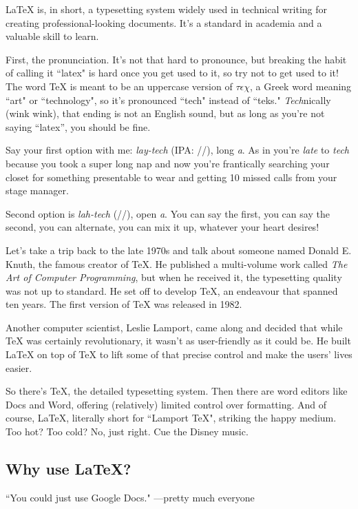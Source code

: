 \documentclass[letterpaper, 12pt]{article}
\begin{document}
\LaTeX{} is, in short, a typesetting system widely used in technical writing for creating professional-looking documents. It's a standard in academia and a valuable skill to learn.

First, the pronunciation. It's not that hard to pronounce, but breaking the habit of calling it ``latex" is hard once you get used to it, so try not to get used to it! The word \TeX{} is meant to be an uppercase version of $\tau \epsilon \chi$, a Greek word meaning ``art" or ``technology", so it's pronounced ``tech" instead of ``teks." \textit{Tech}nically (wink wink), that ending is not an English sound, but as long as you're not saying ``latex'', you should be fine.

Say your first option with me: \textit{lay-tech} (IPA: //), long \emph{a}. As in you're \textit{late} to \textit{tech} because you took a super long nap and now you're frantically searching your closet for something presentable to wear and getting 10 missed calls from your stage manager.

Second option is \textit{lah-tech} (//), open \emph{a}. You can say the first, you can say the second, you can alternate, you can mix it up, whatever your heart desires!

Let's take a trip back to the late 1970s and talk about someone named Donald E. Knuth, the famous creator of \TeX{}. He published a multi-volume work called \textit{The Art of Computer Programming}, but when he received it, the typesetting quality was not up to standard. He set off to develop \TeX{}, an endeavour that spanned ten years. The first version of \TeX{} was released in 1982.

Another computer scientist, Leslie Lamport, came along and decided that while \TeX{} was certainly revolutionary, it wasn't as user-friendly as it could be. He built \LaTeX{} on top of \TeX{} to lift some of that precise control and make the users' lives easier.

So there's \TeX, the detailed typesetting system. Then there are word editors like Docs and Word, offering (relatively) limited control over formatting. And of course, \LaTeX, literally short for ``Lamport \TeX", striking the happy medium. Too hot? Too cold? No, just right. Cue the Disney music.

\subsection{Why use \LaTeX?}
``You could just use Google Docs." ---pretty much everyone
\end{document}
